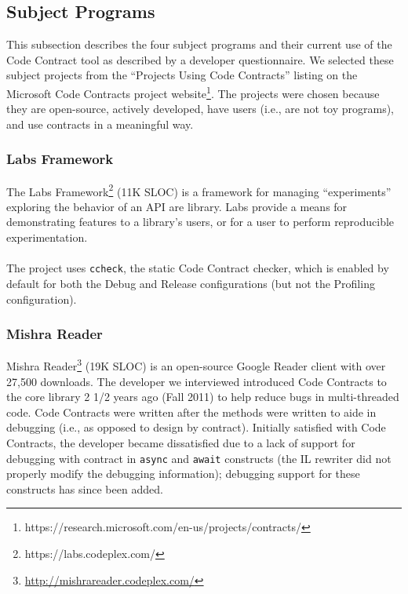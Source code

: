 \subsection{Subject Programs}
\label{sec:subject-programs}

This subsection describes the four subject programs and their
current use of the Code Contract tool as described by a developer
questionnaire. We selected these subject projects from the ``Projects
Using Code Contracts'' listing on the Microsoft Code Contracts
project
website\footnote{https://research.microsoft.com/en-us/projects/contracts/}.
%
The projects were chosen because they are open-source, actively
developed, have users (i.e., are not toy programs), and use contracts
in a meaningful way.

\subsubsection{Labs Framework}

The Labs Framework\footnote{https://labs.codeplex.com/} (11K SLOC) is
a framework for managing ``experiments'' exploring the behavior of an
API are library. Labs provide a means for demonstrating features to a
library's users, or for a user to perform reproducible
experimentation.
\\ \\
The project uses \verb|ccheck|, the static Code Contract checker,
which is enabled by default for both the Debug and Release
configurations (but not the Profiling configuration).

\subsubsection{Mishra Reader}

Mishra Reader\footnote{\url{http://mishrareader.codeplex.com/}}
(19K SLOC) is an open-source Google Reader client with over 27,500
downloads.
%
The developer we interviewed introduced Code Contracts to the core
library 2 1/2 years ago (Fall 2011) to help reduce bugs in
multi-threaded code.
%
Code Contracts were written after the methods were written to aide in
debugging (i.e., as opposed to design by contract).
%
Initially satisfied with Code Contracts, the developer became
dissatisfied due to a lack of support for debugging with contract in
\verb|async| and \verb|await| constructs (the IL rewriter did not
properly modify the debugging information); debugging support for
these constructs has since been added.

